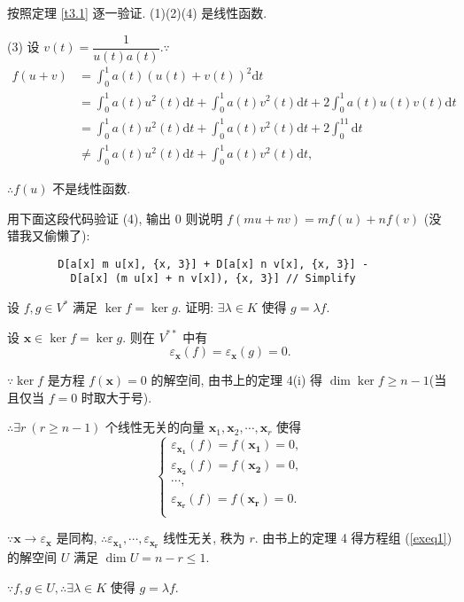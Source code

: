 \documentclass[color=black,device=normal,lang=cn,mode=geye]{elegantnote}
\begin{document}
\begin{solution}
    按照定理 \ref{t3.1} 逐一验证. (1)(2)(4) 是线性函数.

    (3) 设 $v(t)=\dfrac{1}{u(t)a(t)}.\because$
    \begin{align*}
        f(u+v) & =\int_0^1a(t)(u(t)+v(t))^2\mathrm{d}t \\
        & =\int_0^1a(t)u^2(t)\mathrm{d}t+\int_0^1a(t)v^2(t)\mathrm{d}t+2\int_0^1a(t)u(t)v(t)\mathrm{d}t \\
        & =\int_0^1a(t)u^2(t)\mathrm{d}t+\int_0^1a(t)v^2(t)\mathrm{d}t+2\int_0^11\mathrm{d}t \\
        & \neq\int_0^1a(t)u^2(t)\mathrm{d}t+\int_0^1a(t)v^2(t)\mathrm{d}t,
    \end{align*}
    
    $\therefore f(u)$ 不是线性函数.
\end{solution}
\begin{note}
    用下面这段代码验证 (4), 输出 $0$ 则说明 $f(mu+nv)=mf(u)+nf(v)$ (没错我又偷懒了):
    \begin{verbatim}
        D[a[x] m u[x], {x, 3}] + D[a[x] n v[x], {x, 3}] - 
          D[a[x] (m u[x] + n v[x]), {x, 3}] // Simplify
    \end{verbatim}
\end{note}
\begin{exercise}%
    设 $f,g\in V^*$ 满足 $\ker f=\ker g$. 证明: $\exists\lambda\in K$ 使得 $g=\lambda f$.
\end{exercise}
\begin{solution}
    设 $\boldsymbol{x}\in\ker f=\ker g$. 则在 $V^{**}$ 中有
    \[\varepsilon_{\boldsymbol{x}}(f)=\varepsilon_{\boldsymbol{x}}(g)=0.\]

    $\because\ker f$ 是方程 $f(\boldsymbol{x})=0$ 的解空间, 由书上的定理 4(i) 得 $\dim\ker f\geq n-1$(当且仅当 $f=0$ 时取大于号).

    $\therefore\exists r\ (r\geq n-1)$ 个线性无关的向量 $\boldsymbol{x}_1,\boldsymbol{x}_2,\cdots,\boldsymbol{x}_r$ 使得
    \begin{equation}\label{exeq1}
        \begin{cases}
            \varepsilon_{\boldsymbol{x_1}}(f)=f(\boldsymbol{x_1})=0, \\
            \varepsilon_{\boldsymbol{x_2}}(f)=f(\boldsymbol{x_2})=0, \\
            \cdots, \\
            \varepsilon_{\boldsymbol{x_r}}(f)=f(\boldsymbol{x_r})=0. \\
        \end{cases}
    \end{equation}

    $\because\boldsymbol{x}\to\varepsilon_{\boldsymbol{x}}$ 是同构, $\therefore\varepsilon_{\boldsymbol{x_1}},\cdots,\varepsilon_{\boldsymbol{x_r}}$ 线性无关, 秩为 $r$. 由书上的定理 4 得方程组 (\ref{exeq1}) 的解空间 $U$ 满足 $\dim U=n-r\leq 1$.

    $\because f,g\in U,\therefore\exists\lambda\in K$ 使得 $g=\lambda f$.
\end{solution}
\end{document}
